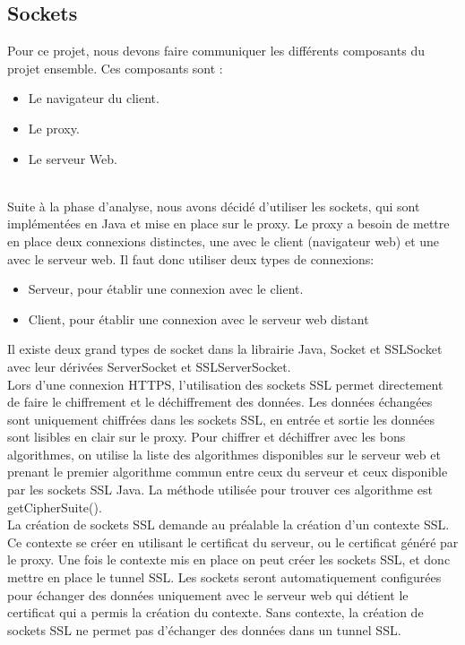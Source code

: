 \documentclass[a4paper,11pt,french]{report}
\begin{document}
\subsection{Sockets}
Pour ce projet, nous devons faire communiquer les différents composants du projet ensemble. Ces composants sont :
\begin{itemize}
\item Le navigateur du client.
\item Le proxy.
\item Le serveur Web.
\end{itemize}
~~\\

Suite à la phase d'analyse, nous avons décidé d'utiliser les sockets, qui sont implémentées en Java 
et mise en place sur le proxy. Le proxy a besoin de mettre en place deux 
connexions distinctes, une avec le client (navigateur web) et une avec le serveur web. Il faut donc utiliser 
deux types de connexions:
\begin{itemize}
  \item Serveur, pour établir une connexion avec le client.
  \item Client, pour établir une connexion avec le serveur web distant
\end{itemize}
Il existe deux grand types de socket dans la librairie Java, Socket et SSLSocket 
avec leur dérivées ServerSocket et SSLServerSocket.
~~\\

Lors d'une connexion HTTPS, l'utilisation des sockets SSL permet directement de 
faire le chiffrement et le déchiffrement des données. Les données échangées sont 
uniquement chiffrées dans les sockets SSL, en entrée et sortie les données sont 
lisibles en clair sur le proxy.
Pour chiffrer et déchiffrer avec les bons algorithmes, on utilise la liste des 
algorithmes disponibles sur le serveur web et prenant le premier algorithme 
commun entre ceux du serveur et ceux disponible par les sockets SSL Java.
La méthode utilisée pour trouver ces algorithme est getCipherSuite().
~~\\

La création de sockets SSL demande au préalable la création d'un contexte SSL. 
Ce contexte se créer en utilisant le certificat du serveur, ou le certificat 
généré par le proxy. Une fois le contexte mis en place on peut créer les sockets 
SSL, et donc mettre en place le tunnel SSL. Les sockets seront automatiquement configurées pour échanger des données 
uniquement avec le serveur web qui détient le certificat qui a permis la 
création du contexte.
Sans contexte, la création de sockets SSL ne permet pas d'échanger des données 
dans un tunnel SSL.
~~\\
\end{document}
